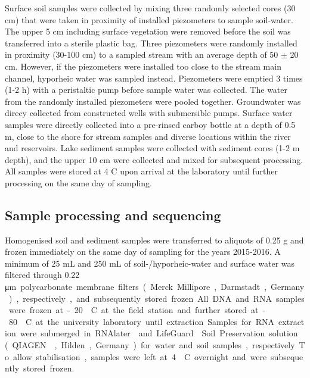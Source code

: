 \documentclass[12pt,a4paper]{article} %
\begin{document}
Surface soil samples were collected by mixing three randomly selected cores (30 cm) that were taken in proximity of installed piezometers to sample soil-water. The upper 5 cm including surface vegetation were removed before the soil was transferred into a sterile plastic bag. Three piezometers were randomly installed in proximity (30-100 cm) to a sampled stream with an average depth of 50 $\pm$ 20 cm. However, if the piezometers were installed too close to the stream main channel, hyporheic water was sampled instead. Piezometers were emptied 3 times (1-2 h) with a peristaltic pump before sample water was collected. The water from the randomly installed piezometers were pooled together. Groundwater was direcy collected from constructed wells with submersible pumps. Surface water samples were directly collected into a pre-rinsed carboy bottle at a depth of 0.5 m, close to the shore for stream samples and diverse locations within the river and reservoirs. Lake sediment samples were collected with sediment cores (1-2 m depth), and the upper 10 cm were collected and mixed for subsequent processing. All samples were stored at 4 \textdegree{}C upon arrival at the laboratory until further processing on the same day of sampling. 

\subsection*{Sample processing and sequencing}
Homogenised soil and sediment samples were transferred to aliquots of 0.25 g and frozen immediately on the same day of sampling for the years 2015-2016. A minimum of 25 mL and 250 mL of soil-/hyporheic-water and surface water was filtered through 0.22 \si\micro m polycarbonate membrane filters (Merck Millipore, Darmstadt, Germany), respectively, and subsequently stored frozen. All DNA and RNA samples were frozen at -20 \textdegree{}C at the field station and further stored at -80 \textdegree{}C at the university laboratory until extraction. Samples for RNA extraction were submerged in RNAlater\textsuperscript{\textregistered} and LifeGuard\textsuperscript{\textregistered} Soil Preservation solution (QIAGEN\textsuperscript{\textregistered}, Hilden, Germany) for water and soil samples, respectively. To allow stabilisation, samples were left at 4 \textdegree{}C overnight and were subsequently stored frozen.
\end{document}

